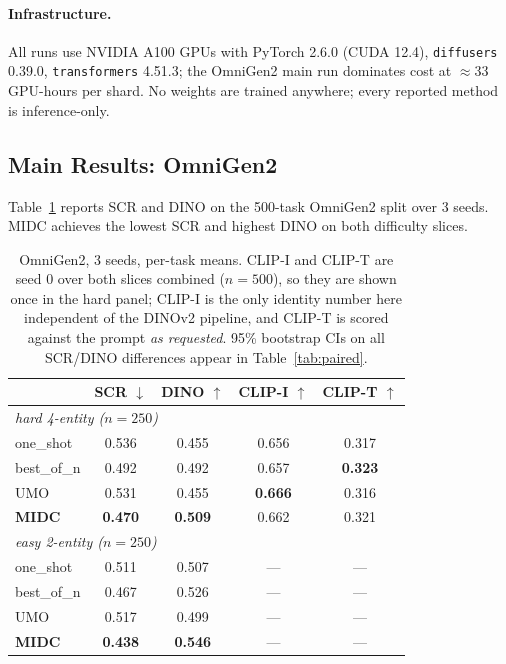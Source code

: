 \documentclass[letterpaper]{article}
\begin{document}
\paragraph{Infrastructure.} All runs use NVIDIA A100 GPUs with PyTorch 2.6.0 (CUDA 12.4), \texttt{diffusers} 0.39.0, \texttt{transformers} 4.51.3; the OmniGen2 main run dominates cost at ${\approx}33$ GPU-hours per shard. No weights are trained anywhere; every reported method is inference-only.

\subsection{Main Results: OmniGen2}
\label{sec:main}

Table~\ref{tab:main} reports SCR and DINO on the 500-task OmniGen2 split over 3 seeds. MIDC achieves the lowest SCR and highest DINO on both difficulty slices.

\begin{table}[t]
\centering
\small
\begin{tabular}{lcccc}
\toprule
& SCR $\downarrow$ & DINO $\uparrow$ & CLIP-I $\uparrow$ & CLIP-T $\uparrow$ \\
\midrule
\multicolumn{5}{l}{\textit{hard 4-entity ($n{=}250$)}} \\
one\_shot & 0.536 & 0.455 & 0.656 & 0.317 \\
best\_of\_n & 0.492 & 0.492 & 0.657 & \textbf{0.323} \\
UMO & 0.531 & 0.455 & \textbf{0.666} & 0.316 \\
\textbf{MIDC} & \textbf{0.470} & \textbf{0.509} & 0.662 & 0.321 \\
\midrule
\multicolumn{5}{l}{\textit{easy 2-entity ($n{=}250$)}} \\
one\_shot & 0.511 & 0.507 & --- & --- \\
best\_of\_n & 0.467 & 0.526 & --- & --- \\
UMO & 0.517 & 0.499 & --- & --- \\
\textbf{MIDC} & \textbf{0.438} & \textbf{0.546} & --- & --- \\
\bottomrule
\end{tabular}
\caption{OmniGen2, 3 seeds, per-task means. CLIP-I and CLIP-T are seed 0 over both slices combined ($n{=}500$), so they are shown once in the hard panel; CLIP-I is the only identity number here independent of the DINOv2 pipeline, and CLIP-T is scored against the prompt \emph{as requested}. 95\% bootstrap CIs on all SCR/DINO differences appear in Table~\ref{tab:paired}.}
\label{tab:main}
\end{table}
\end{document}
